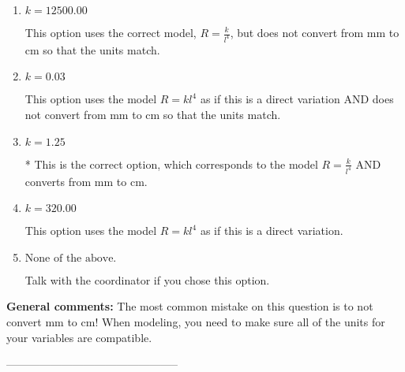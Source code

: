 \documentclass{extbook}[14pt]
\begin{document}
\begin{enumerate}[label=\Alph*.] 
\item $ k = 12500.00 $ 

 This option uses the correct model, $R = \frac{k}{l^{4}}$, but does not convert from mm to cm so that the units match. 
\item $ k = 0.03 $ 

 This option uses the model $R = kl^{4}$ as if this is a direct variation AND does not convert from mm to cm so that the units match. 
\item $ k = 1.25 $ 

 * This is the correct option, which corresponds to the model $R = \frac{k}{l^{4}}$ AND converts from mm to cm. 
\item $ k = 320.00 $ 

 This option uses the model $R = kl^{4}$ as if this is a direct variation. 
\item $ \text{None of the above.} $ 

 Talk with the coordinator if you chose this option. 
\end{enumerate} 
 
\textbf{General comments:} The most common mistake on this question is to not convert mm to cm! When modeling, you need to make sure all of the units for your variables are compatible.

-----------------------------------------------
\end{document}
